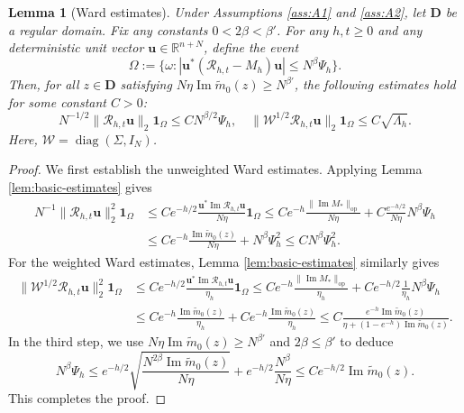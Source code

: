 \documentclass[11pt,reqno]{amsart}
\def\R{\mathbb{R}}
\def\u{\mathbf{u}}
\def\1{\mathbf{1}}
\def\cR{\mathcal{R}}
\def\cW{\mathcal{W}}
\def\bD{\mathbf{D}}
\def\Im{\operatorname{Im}}
\def\op{\mathrm{op}}
\def\diag{\operatorname{diag}}
\newtheorem{lemma}[theorem]{Lemma}
\theoremstyle{definition}
\numberwithin{equation}{section}
\numberwithin{figure}{section}
\begin{document}
\begin{lemma}[Ward estimates]\label{lem:ward-estimate}
Under Assumptions \ref{ass:A1} and \ref{ass:A2}, let $\bD$ be a regular domain. Fix any constants $0<2\beta<\beta'$. For any $h,t\geq 0$ and any deterministic unit vector $\u\in\R^{n+N}$, define the event
\[
    \Omega:=\{\omega:|\u^*(\cR_{h,t}-M_{h})\u|\leq N^\beta\Psi_h\}.
\]
Then, for all $z\in\bD$ satisfying $N\eta\Im\widetilde m_0(z)\geq N^{\beta'}$, the following estimates hold for some constant $C>0$:
\begin{equation}
    N^{-1/2}\|\cR_{h,t}\u\|_2\1_\Omega\leq CN^{\beta/2}\Psi_h,
    \quad  \|\cW^{1/2}\cR_{h,t}\u\|_2\1_\Omega\leq C\sqrt{\Lambda_h}.
\end{equation}
Here, $\cW=\diag(\Sigma,I_N)$.
\end{lemma}
\begin{proof}
We first establish the unweighted Ward estimates. Applying Lemma \ref{lem:basic-estimates} gives
\begin{align*}
    N^{-1}\|\cR_{h,t}\u\|_2^2\1_\Omega&\leq Ce^{-h/2}\frac{\u^*\Im\cR_{h,t}\u}{N\eta}\1_\Omega\leq Ce^{-h}\frac{\|\Im M_{*}\|_\op}{N\eta}+C\frac{e^{-h/2}}{N\eta}N^\beta\Psi_h\\
    &\leq Ce^{-h}\frac{\Im\widetilde m_0(z)}{N\eta}+N^\beta\Psi_h^2\leq CN^\beta\Psi_h^2.
\end{align*}
For the weighted Ward estimates, Lemma \ref{lem:basic-estimates} similarly gives
\begin{align*}
    \|\cW^{1/2}\cR_{h,t}\u\|_2^2\1_\Omega&\leq Ce^{-h/2}\frac{\u^*\Im\cR_{h,t}\u}{\eta_h}\1_\Omega\leq Ce^{-h}\frac{\|\Im M_*\|_\op}{\eta_h}+Ce^{-h/2}\frac{1}{\eta_h}N^\beta\Psi_h\\
    &\leq Ce^{-h}\frac{\Im\widetilde m_0(z)}{\eta_h}+Ce^{-h}\frac{\Im\widetilde m_0(z)}{\eta_h}\leq C\frac{e^{-h}\Im\widetilde m_0(z)}{\eta+(1-e^{-h})\Im\widetilde m_0(z)}.
\end{align*}
In the third step, we use $N\eta\Im\widetilde m_0(z)\geq N^{\beta'}$ and $2\beta\leq \beta'$ to deduce
\[
    N^\beta\Psi_h\leq e^{-h/2}\sqrt{\frac{N^{2\beta}\Im\widetilde m_0(z)}{N\eta}}+e^{-h/2}\frac{N^\beta}{N\eta}\leq Ce^{-h/2}\Im\widetilde m_0(z).
\]
This completes the proof.
\end{proof}
\end{document}
